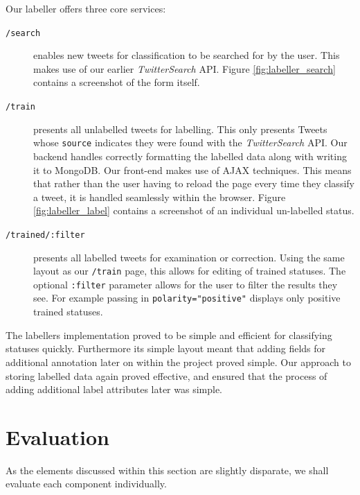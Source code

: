 Our labeller offers three core services:

\begin{description}
	\item [\texttt{/search}] enables new tweets for classification to be searched for by the user. This makes use of our earlier \emph{TwitterSearch} API. Figure \ref{fig:labeller_search} contains a screenshot of the form itself.
	\item [\texttt{/train}] presents all unlabelled tweets for labelling. This only presents Tweets whose \texttt{source} indicates they were found with the \emph{TwitterSearch} API. Our backend handles correctly formatting the labelled data along with writing it to MongoDB. Our front-end makes use of AJAX techniques. This means that rather than the user having to reload the page every time they classify a tweet, it is handled seamlessly within the browser. Figure \ref{fig:labeller_label} contains a screenshot of an individual un-labelled status.
	\item [\texttt{/trained/:filter}] presents all labelled tweets for examination or correction. Using the same layout as our \texttt{/train} page, this allows for editing of trained statuses. The optional \texttt{:filter} parameter allows for the user to filter the results they see. For example passing in \texttt{polarity="positive"} displays only positive trained statuses.
\end{description}

The labellers implementation proved to be simple and efficient for classifying statuses quickly. Furthermore its simple layout meant that adding fields for additional annotation later on within the project proved simple. Our approach to storing labelled data again proved effective, and ensured that the process of adding additional label attributes later was simple.

\section{Evaluation}

As the elements discussed within this section are slightly disparate, we shall evaluate each component individually.

